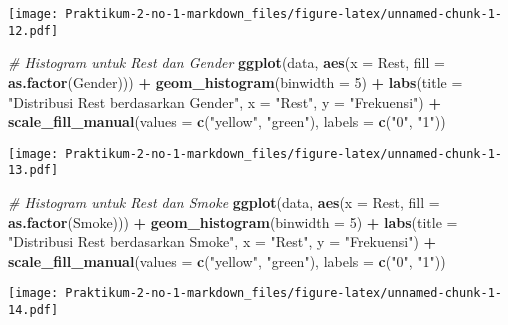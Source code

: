 \documentclass[
]{article}
\newenvironment{Shaded}{\begin{snugshade}}{\end{snugshade}}
\newcommand{\AttributeTok}[1]{\textcolor[rgb]{0.13,0.29,0.53}{#1}}
\newcommand{\CommentTok}[1]{\textcolor[rgb]{0.56,0.35,0.01}{\textit{#1}}}
\newcommand{\DecValTok}[1]{\textcolor[rgb]{0.00,0.00,0.81}{#1}}
\newcommand{\FunctionTok}[1]{\textcolor[rgb]{0.13,0.29,0.53}{\textbf{#1}}}
\newcommand{\NormalTok}[1]{#1}
\newcommand{\SpecialCharTok}[1]{\textcolor[rgb]{0.81,0.36,0.00}{\textbf{#1}}}
\newcommand{\StringTok}[1]{\textcolor[rgb]{0.31,0.60,0.02}{#1}}
\begin{document}
\texttt{[image: Praktikum-2-no-1-markdown\_files/figure-latex/unnamed-chunk-1-12.pdf]}

\begin{Shaded}
\begin{Highlighting}[]
\CommentTok{\# Histogram untuk Rest dan Gender}
\FunctionTok{ggplot}\NormalTok{(data, }\FunctionTok{aes}\NormalTok{(}\AttributeTok{x =}\NormalTok{ Rest, }\AttributeTok{fill =} \FunctionTok{as.factor}\NormalTok{(Gender))) }\SpecialCharTok{+}
  \FunctionTok{geom\_histogram}\NormalTok{(}\AttributeTok{binwidth =} \DecValTok{5}\NormalTok{) }\SpecialCharTok{+}
  \FunctionTok{labs}\NormalTok{(}\AttributeTok{title =} \StringTok{"Distribusi Rest berdasarkan Gender"}\NormalTok{,}
       \AttributeTok{x =} \StringTok{"Rest"}\NormalTok{,}
       \AttributeTok{y =} \StringTok{"Frekuensi"}\NormalTok{) }\SpecialCharTok{+}
  \FunctionTok{scale\_fill\_manual}\NormalTok{(}\AttributeTok{values =} \FunctionTok{c}\NormalTok{(}\StringTok{"yellow"}\NormalTok{, }\StringTok{"green"}\NormalTok{), }\AttributeTok{labels =} \FunctionTok{c}\NormalTok{(}\StringTok{"0"}\NormalTok{, }\StringTok{"1"}\NormalTok{))}
\end{Highlighting}
\end{Shaded}

\texttt{[image: Praktikum-2-no-1-markdown\_files/figure-latex/unnamed-chunk-1-13.pdf]}

\begin{Shaded}
\begin{Highlighting}[]
\CommentTok{\# Histogram untuk Rest dan Smoke}
\FunctionTok{ggplot}\NormalTok{(data, }\FunctionTok{aes}\NormalTok{(}\AttributeTok{x =}\NormalTok{ Rest, }\AttributeTok{fill =} \FunctionTok{as.factor}\NormalTok{(Smoke))) }\SpecialCharTok{+}
  \FunctionTok{geom\_histogram}\NormalTok{(}\AttributeTok{binwidth =} \DecValTok{5}\NormalTok{) }\SpecialCharTok{+}
  \FunctionTok{labs}\NormalTok{(}\AttributeTok{title =} \StringTok{"Distribusi Rest berdasarkan Smoke"}\NormalTok{,}
       \AttributeTok{x =} \StringTok{"Rest"}\NormalTok{,}
       \AttributeTok{y =} \StringTok{"Frekuensi"}\NormalTok{) }\SpecialCharTok{+}
  \FunctionTok{scale\_fill\_manual}\NormalTok{(}\AttributeTok{values =} \FunctionTok{c}\NormalTok{(}\StringTok{"yellow"}\NormalTok{, }\StringTok{"green"}\NormalTok{), }\AttributeTok{labels =} \FunctionTok{c}\NormalTok{(}\StringTok{"0"}\NormalTok{, }\StringTok{"1"}\NormalTok{))}
\end{Highlighting}
\end{Shaded}

\texttt{[image: Praktikum-2-no-1-markdown\_files/figure-latex/unnamed-chunk-1-14.pdf]}
\end{document}
